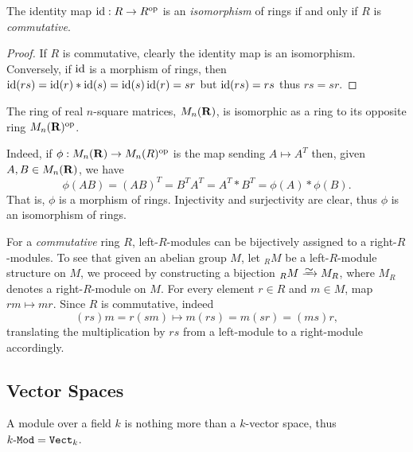 \begin{corollary}
    \label{cor:id-ring-and-opposite}
    The identity map \(\operatorname{id}: R \to R^{\mathrm{op}}\) is an \emph{isomorphism} of rings if and
    only if \(R\) is \emph{commutative}.
\end{corollary}

\begin{proof}
    If \(R\) is commutative, clearly the identity map is an isomorphism. Conversely,
    if \(\operatorname{id}\) is a morphism of rings, then
    \(\operatorname{id}(r s) = \operatorname{id}(r) * \operatorname{id}(s) = \operatorname{id}(s) \operatorname{id}(r) = s r\) but
    \(\operatorname{id}(r s) = r s\) thus \(r s = s r\).
\end{proof}

\begin{example}
    \label{exp:ring-of-square-matrices}
    The ring of real \(n\)-square matrices, \(M_n(\mathbf{R})\), is isomorphic as a ring to
    its opposite ring \(M_n(\mathbf{R})^{\mathrm{op}}\).

    Indeed, if \(\phi: M_n(\mathbf{R}) \to M_n(R)^{\mathrm{op}}\) is the map sending \(A \mapsto
    A^T\) then, given \(A, B \in M_n(\mathbf{R})\), we have
    \[
        \phi(A B) = (A B)^T = B^T A^T = A^T * B^T = \phi(A) * \phi(B).
    \]
    That is, \(\phi\) is a morphism of rings. Injectivity and surjectivity are
    clear, thus \(\phi\) is an isomorphism of rings.
\end{example}

\begin{example}
    \label{exp:right-module-to-left-module}
    For a \emph{commutative} ring \(R\), left-\(R\)-modules can be bijectively
    assigned to a right-\(R\)-modules. To see that given an abelian group \(M\), let
    \({}_RM\) be a left-\(R\)-module structure on \(M\), we proceed by constructing
    a bijection \({}_RM \isoto M_R\), where \(M_R\) denotes a right-\(R\)-module on
    \(M\). For every element \(r \in R\) and \(m \in M\), map \(r m \mapsto m
    r\). Since \(R\) is commutative, indeed
    \[
        (r s) m = r (s m) \longmapsto m (r s) = m (s r) = (m s) r,
    \]
    translating the multiplication by \(r s\) from a left-module to a right-module
    accordingly.
\end{example}

\subsection{Vector Spaces}

\begin{example}
    \label{exp:vector-space-is-k-module}
    A module over a field \(k\) is nothing more than a \(k\)-vector space, thus
    \({k\text{-}\texttt{Mod}} = {\texttt{Vect}}_k\).
\end{example}

